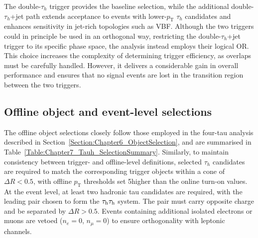 The double-$\tau_h$ trigger provides the baseline selection, while the additional double-$\tau_h$+jet path extends acceptance to events with lower-$p_\text{T}$ $\tau_h$ candidates and enhances sensitivity in jet-rich topologies such as \ac{VBF}. Although the two triggers could in principle be used in an orthogonal way, restricting the double-$\tau_h$+jet trigger to its specific phase space, the analysis instead employs their logical OR. This choice increases the complexity of determining trigger efficiency, as overlaps must be carefully handled. However, it delivers a considerable gain in overall performance and ensures that no signal events are lost in the transition region between the two triggers. 

\subsection{Offline object and event-level selections}

The offline object selections closely follow those employed in the four-tau analysis described in Section~\ref{Section:Chapter6_ObjectSelection}, and are summarised in Table~\ref{Table:Chapter7_Tauh_SelectionSummary}. Similarly, to maintain consistency between trigger- and offline-level definitions, selected $\tau_h$ candidates are required to match the corresponding trigger objects within a cone of $\Delta R < 0.5$, with offline $p_\text{T}$ thresholds set 5\GeV higher than the online turn-on values. At the event level, at least two hadronic tau candidates are required, with the leading pair chosen to form the $\tau_\mathrm{h}\tau_\mathrm{h}$ system. The pair must carry opposite charge and be separated by $\Delta R > 0.5$. Events containing additional isolated electrons or muons are vetoed ($n_e = 0$, $n_\mu = 0$) to ensure orthogonality with leptonic channels. 


